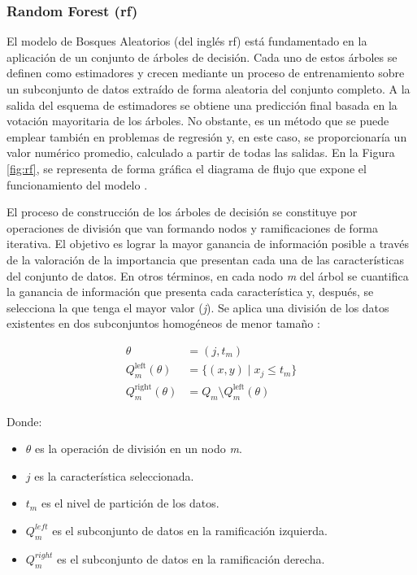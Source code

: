 \subsubsection{Random Forest (\acrshort{rf})}
\label{sec:mlrf}

El modelo de Bosques Aleatorios (del inglés \acrfull{rf}) está fundamentado en la aplicación de un conjunto de árboles de decisión. Cada uno de estos árboles se definen como estimadores y crecen mediante un proceso de entrenamiento sobre un subconjunto de datos extraído de forma aleatoria del conjunto completo. A la salida del esquema de estimadores se obtiene una predicción final basada en la votación mayoritaria de los árboles. No obstante, es un método que se puede emplear también en problemas de regresión y, en este caso, se proporcionaría un valor numérico promedio, calculado a partir de todas las salidas. En la Figura \ref{fig:rf}, se representa de forma gráfica el diagrama de flujo que expone el funcionamiento del modelo \cite{rfmedium}.

\vspace{3mm}

El proceso de construcción de los árboles de decisión se constituye por operaciones de división que van formando nodos y ramificaciones de forma iterativa. El objetivo es lograr la mayor ganancia de información posible a través de la valoración de la importancia que presentan cada una de las características del conjunto de datos. En otros términos, en cada nodo \textit{m} del árbol se cuantifica la ganancia de información que presenta cada característica y, después, se selecciona la que tenga el mayor valor (\textit{j}). Se aplica una división de los datos existentes en dos subconjuntos homogéneos de menor tamaño \cite{rfmedium2}:

\begin{equation}
    \begin{aligned}
        \theta &= (j, t_m) \\
        Q_m^{\text{left}}(\theta) &= \{(x, y) \mid x_j \leq t_m\} \\
        Q_m^{\text{right}}(\theta) &= Q_m \setminus Q_m^{\text{left}}(\theta)
    \end{aligned}
\end{equation}
    

Donde:
\begin{itemize}
    \renewcommand{\labelitemi}{}
    \item \( \theta \) es la operación de división en un nodo \textit{m}.
    \item \( j\) es la característica seleccionada.
    \item \( t_m\) es el nivel de partición de los datos.
    \item \( Q_m^{left}\) es el subconjunto de datos en la ramificación izquierda.
    \item \( Q_m^{right}\) es el subconjunto de datos en la ramificación derecha.
\end{itemize}

